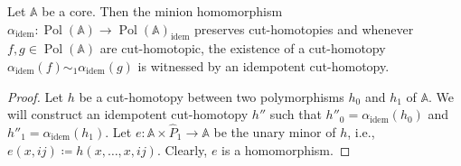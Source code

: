 \documentclass[oneside]{amsart}
\newcommand{\str}[1]{\mathbb{#1}}
\newcommand{\pol}{\operatorname{Pol}}
\newcommand{\idem}{\mathrm{idem}}
\begin{document}
\begin{lemma}\label{lem:core_to_idemp}
        Let $\str A$ be a core. 
        Then the minion homomorphism $\alpha_\idem\colon \pol(\str A)\to \pol(\str A)_\idem$
        preserves cut-homotopies and 
        whenever $f,g\in\pol(\str A)$ are cut-homotopic, the existence of a cut-homotopy $\alpha_\idem(f)\sim_1\alpha_\idem(g)$ is witnessed by an idempotent cut-homotopy.
\end{lemma}


\begin{proof}
    Let $h$ be a cut-homotopy between two polymorphisms $h_{0}$ and $h_{1}$ of $\str A$.
    We will construct an idempotent cut-homotopy $h''$ such that $h''_{0} = \alpha_{\idem}(h_{0})$ and $h''_{1} = \alpha_{\idem}(h_{1})$.
    Let $e\colon \str A\times {\hat P_1} \to \str A$ be the unary minor of $h$, i.e., $e(x,ij)\coloneq h(x,\ldots,x, ij)$.
    Clearly, $e$ is a homomorphism.
    

\end{proof}
\end{document}
